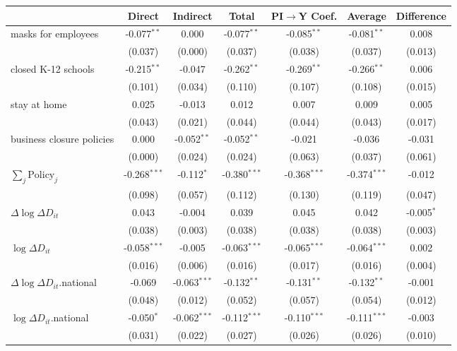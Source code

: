 
\begin{tabular}{lccccc|>{}c}
\toprule
  & Direct & Indirect & Total & PI$\to$Y Coef. & Average & Difference\\
\midrule
masks for employees & -0.077$^{**}$ & 0.000 & -0.077$^{**}$ & -0.085$^{**}$ & -0.081$^{**}$ & 0.008\\
 & (0.037) & (0.000) & (0.037) & (0.038) & (0.037) & (0.013)\\
closed K-12 schools & -0.215$^{**}$ & -0.047 & -0.262$^{**}$ & -0.269$^{**}$ & -0.266$^{**}$ & 0.006\\
 & (0.101) & (0.034) & (0.110) & (0.107) & (0.108) & (0.015)\\
stay at home & 0.025 & -0.013 & 0.012 & 0.007 & 0.009 & 0.005\\
 & (0.043) & (0.021) & (0.044) & (0.044) & (0.043) & (0.017)\\
business closure policies & 0.000 & -0.052$^{**}$ & -0.052$^{**}$ & -0.021 & -0.036 & -0.031\\
 & (0.000) & (0.024) & (0.024) & (0.063) & (0.037) & (0.061)\\
$\sum_j \mathrm{Policy}_j$ & -0.268$^{***}$ & -0.112$^{*}$ & -0.380$^{***}$ & -0.368$^{***}$ & -0.374$^{***}$ & -0.012\\
 & (0.098) & (0.057) & (0.112) & (0.130) & (0.119) & (0.047)\\
$\Delta \log \Delta D_{it}$ & 0.043 & -0.004 & 0.039 & 0.045 & 0.042 & -0.005$^{*}$\\
 & (0.038) & (0.003) & (0.038) & (0.038) & (0.038) & (0.003)\\
$\log \Delta D_{it}$ & -0.058$^{***}$ & -0.005 & -0.063$^{***}$ & -0.065$^{***}$ & -0.064$^{***}$ & 0.002\\
 & (0.016) & (0.006) & (0.016) & (0.017) & (0.016) & (0.004)\\
$\Delta \log \Delta D_{it}$.national & -0.069 & -0.063$^{***}$ & -0.132$^{**}$ & -0.131$^{**}$ & -0.132$^{**}$ & -0.001\\
 & (0.048) & (0.012) & (0.052) & (0.057) & (0.054) & (0.012)\\
$\log \Delta D_{it}$.national & -0.050$^{*}$ & -0.062$^{***}$ & -0.112$^{***}$ & -0.110$^{***}$ & -0.111$^{***}$ & -0.003\\
 & (0.031) & (0.022) & (0.027) & (0.026) & (0.026) & (0.010)\\
\bottomrule
\end{tabular}